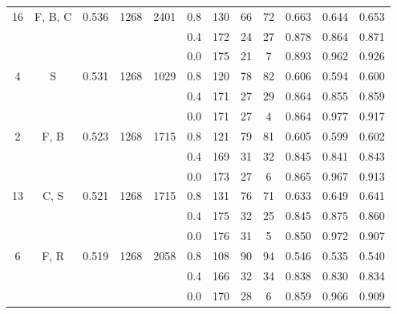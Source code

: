 \documentclass[preprint,12pt,authoryear]{elsarticle}
\begin{document}
\begin{table}[ht]
\begin{tabular}{c c c c  c ccc c c c c}
\multirow{3}{*}{16} &  \multirow{3}{*}{F, B, C} & \multirow{3}{*}{0.536 } & \multirow{3}{*}{1268} & \multirow{3}{*}{2401} &0.8 & 130 & 66 & 72 & 0.663  & 0.644  & 0.653 \\
 &  & &  &   & 0.4 & 172 & 24 & 27 & 0.878  & 0.864  & 0.871 \\
 &  & &  &   & 0.0 & 175 & 21 & 7 & 0.893  & 0.962  & 0.926 \\
\midrule
\multirow{3}{*}{4} &  \multirow{3}{*}{S} & \multirow{3}{*}{0.531 } & \multirow{3}{*}{1268} & \multirow{3}{*}{1029} &0.8 & 120 & 78 & 82 & 0.606  & 0.594  & 0.600 \\
 &  & &  &   & 0.4 & 171 & 27 & 29 & 0.864  & 0.855  & 0.859 \\
 &  & &  &   & 0.0 & 171 & 27 & 4 & 0.864  & 0.977  & 0.917 \\
\midrule
\multirow{3}{*}{2} &  \multirow{3}{*}{F, B} & \multirow{3}{*}{0.523 } & \multirow{3}{*}{1268} & \multirow{3}{*}{1715} &0.8 & 121 & 79 & 81 & 0.605  & 0.599  & 0.602 \\
 &  & &  &   & 0.4 & 169 & 31 & 32 & 0.845  & 0.841  & 0.843 \\
 &  & &  &   & 0.0 & 173 & 27 & 6 & 0.865  & 0.967  & 0.913 \\
\midrule
\multirow{3}{*}{13} &  \multirow{3}{*}{C, S} & \multirow{3}{*}{0.521 } & \multirow{3}{*}{1268} & \multirow{3}{*}{1715} &0.8 & 131 & 76 & 71 & 0.633  & 0.649  & 0.641 \\
 &  & &  &   & 0.4 & 175 & 32 & 25 & 0.845  & 0.875  & 0.860 \\
 &  & &  &   & 0.0 & 176 & 31 & 5 & 0.850  & 0.972  & 0.907 \\
\midrule
\multirow{3}{*}{6} &  \multirow{3}{*}{F, R} & \multirow{3}{*}{0.519 } & \multirow{3}{*}{1268} & \multirow{3}{*}{2058} &0.8 & 108 & 90 & 94 & 0.546  & 0.535  & 0.540 \\
 &  & &  &   & 0.4 & 166 & 32 & 34 & 0.838  & 0.830  & 0.834 \\
 &  & &  &   & 0.0 & 170 & 28 & 6 & 0.859  & 0.966  & 0.909 \\
 
\hline
\hline


\end{tabular}
\end{table}
\end{document}
